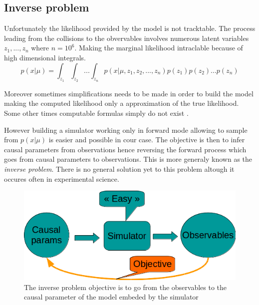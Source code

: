\subsection{Inverse problem} %
\label{sub:inverse_problem}


Unfortunately the likelihood provided by the model is not tracktable.
The process leading from the collisions to the obvervables involves numerous latent variables $z_1, ..., z_n$ where $n=10^6$.
Making the marginal likelihood intraclable because of high dimensional integrals.
\begin{equation}
	\label{eq:intractable_integral}
	p(x|\mu) = \int_{z_1} \int_{z_2} ... \int_{z_n} p(x|\mu, z_1, z_2, ..., z_n) p(z_1) p(z_2) ... p(z_n)
\end{equation}


Moreover sometimes simplifications needs to be made in order to build the model \needcite making the computed likelihood only a approximation of the true likelihood.
Some other times computable formulas simply do not exist \needcite.



However building a simulator working only in forward mode allowing to sample from $p(x|\mu)$ is easier and possible in cour case.
The objective is then to infer causal parameters from observations hence reversing the forward process which goes from causal parameters to observations.
This is more generaly known as the \emph{inverse problem}.
There is no general solution yet to this problem altough it occures often in experimental science.


\begin{figure}[htb]
    \centering
    \includegraphics[width=0.8\linewidth]{inverse_problem}
    \caption{The inverse problem objective is to go from the observables to the causal parameter of the model embeded by the simulator}
    \label{fig:inverse_problem}
\end{figure}








